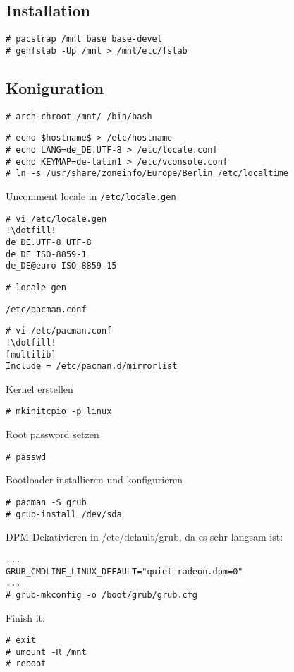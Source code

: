 \subsection{Installation}
\label{subsec:installation}
\begin{lstlisting}[style=Bash]
# pacstrap /mnt base base-devel 
# genfstab -Up /mnt > /mnt/etc/fstab 
\end{lstlisting}

\subsection{Koniguration}
\label{subsec:config}
\begin{lstlisting}[style=Bash]
# arch-chroot /mnt/ /bin/bash
\end{lstlisting}
\begin{lstlisting}[style=Bash]
# echo $hostname$ > /etc/hostname
# echo LANG=de_DE.UTF-8 > /etc/locale.conf
# echo KEYMAP=de-latin1 > /etc/vconsole.conf
# ln -s /usr/share/zoneinfo/Europe/Berlin /etc/localtime
\end{lstlisting}
Uncomment locale in 
\colorbox{listblue}{\lstinline|/etc/locale.gen|}
\begin{lstlisting}[style=Bash]
# vi /etc/locale.gen
!\dotfill!
de_DE.UTF-8 UTF-8
de_DE ISO-8859-1
de_DE@euro ISO-8859-15
\end{lstlisting}
\begin{lstlisting}[style=Bash]
# locale-gen 
\end{lstlisting}
\colorbox{listblue}{\lstinline|/etc/pacman.conf|}
\begin{lstlisting}[style=Bash]
# vi /etc/pacman.conf
!\dotfill!
[multilib]
Include = /etc/pacman.d/mirrorlist
\end{lstlisting}
Kernel erstellen
\begin{lstlisting}[style=Bash]
# mkinitcpio -p linux
\end{lstlisting}
Root password setzen 
\begin{lstlisting}[style=Bash]
# passwd
\end{lstlisting}
Bootloader installieren und konfigurieren
\begin{lstlisting}[style=Bash]
# pacman -S grub 
# grub-install /dev/sda 
\end{lstlisting}
DPM Dekativieren in /etc/default/grub, da es sehr langsam ist:
\begin{lstlisting}[style=Bash]
...
GRUB_CMDLINE_LINUX_DEFAULT="quiet radeon.dpm=0"
...
# grub-mkconfig -o /boot/grub/grub.cfg 
\end{lstlisting}
Finish it:
\begin{lstlisting}[style=Bash]
# exit 
# umount -R /mnt
# reboot 
\end{lstlisting}

